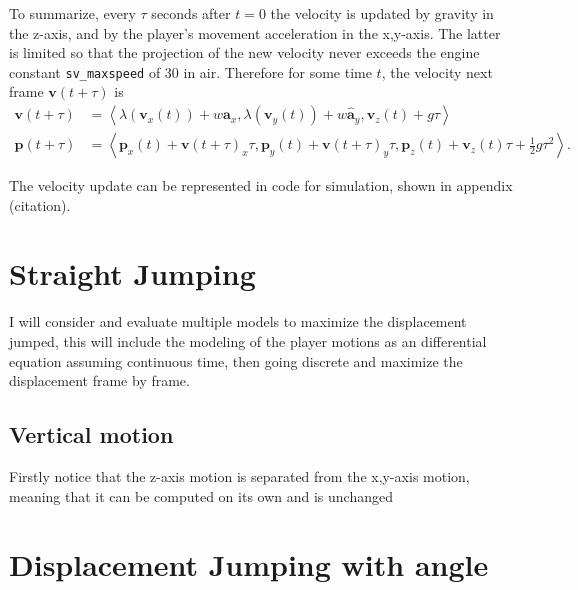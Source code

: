 \documentclass[a4paper,12pt]{article}
\newcommand{\tvec}[1]{\boldsymbol{#1}}
\newcommand{\tunit}[1]{\boldsymbol{\hat{#1}}}
\newcommand{\tang}[1]{\left\langle #1 \right\rangle}
\newcommand{\tv}{\tvec{v}}
\newcommand{\tp}{\tvec{p}}
\begin{document}
To summarize, every $\tau$ seconds after $t=0$ the velocity is updated by gravity in the z-axis, and by the player's movement acceleration in the x,y-axis. The latter is limited so that the projection of the new velocity never exceeds the engine constant \verb|sv_maxspeed| of 30 in air. Therefore for some time $t$, the velocity next frame $\tv(t+\tau)$ is
\begin{align*}
    \tv(t+\tau) &= \tang{\lambda(\tv_x(t)) + w \tunit{a}_x, \lambda(\tv_y(t)) + w\tunit{a}_y,\tv_z(t) + g\tau}\\
    \tp(t+\tau) &= \tang{\tp_x(t) + \tv(t+\tau)_x \tau, \tp_y(t) + \tv(t+\tau)_y \tau, \tp_z(t) + \tv_z(t)\tau + \frac{1}{2}g\tau^2}.
\end{align*}

The velocity update can be represented in code for simulation, shown in appendix (citation).

\section{Straight Jumping}
I will consider and evaluate multiple models to maximize the displacement jumped, this will include the modeling of the player motions as an differential equation assuming continuous time, then going discrete and maximize the displacement frame by frame.

\subsection{Vertical motion}
Firstly notice that the z-axis motion is separated from the x,y-axis motion, meaning that it can be computed on its own and is unchanged 

\section{Displacement Jumping with angle}








\nocite{*}
\newpage
\printbibliography
\end{document}
